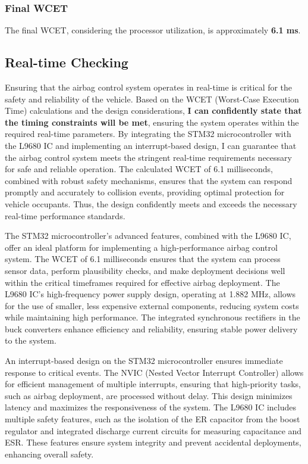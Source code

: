 \documentclass[12pt	]{article}
\begin{document}
\subsubsection{Final WCET}
The final WCET, considering the processor utilization, is approximately \textbf{6.1 ms}.














\subsection{Real-time Checking}
Ensuring that the airbag control system operates in real-time is critical for the safety and reliability of the vehicle. Based on the WCET (Worst-Case Execution Time) calculations and the design considerations, \textbf{I can confidently state that the timing constraints will be met}, ensuring the system operates within the required real-time parameters. By integrating the STM32 microcontroller with the L9680 IC and implementing an interrupt-based design, I can guarantee that the airbag control system meets the stringent real-time requirements necessary for safe and reliable operation. The calculated WCET of 6.1 milliseconds, combined with robust safety mechanisms, ensures that the system can respond promptly and accurately to collision events, providing optimal protection for vehicle occupants. Thus, the design confidently meets and exceeds the necessary real-time performance standards.

The STM32 microcontroller's advanced features, combined with the L9680 IC, offer an ideal platform for implementing a high-performance airbag control system. The WCET of 6.1 milliseconds ensures that the system can process sensor data, perform plausibility checks, and make deployment decisions well within the critical timeframes required for effective airbag deployment. The L9680 IC's high-frequency power supply design, operating at 1.882 MHz, allows for the use of smaller, less expensive external components, reducing system costs while maintaining high performance. The integrated synchronous rectifiers in the buck converters enhance efficiency and reliability, ensuring stable power delivery to the system.

An interrupt-based design on the STM32 microcontroller ensures immediate response to critical events. The NVIC (Nested Vector Interrupt Controller) allows for efficient management of multiple interrupts, ensuring that high-priority tasks, such as airbag deployment, are processed without delay. This design minimizes latency and maximizes the responsiveness of the system. The L9680 IC includes multiple safety features, such as the isolation of the ER capacitor from the boost regulator and integrated discharge current circuits for measuring capacitance and ESR. These features ensure system integrity and prevent accidental deployments, enhancing overall safety.
\end{document}
